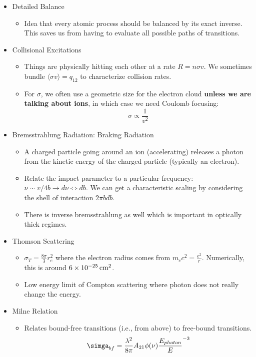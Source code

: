 \documentclass{article}
\newcommand{\unit}[1]{{\,\rm #1}}
\newcommand{\cm}{\unit{cm}}
\begin{document}
\begin{itemize}
    \item Detailed Balance
    \begin{itemize}
        \item Idea that every atomic process should be balanced by its exact inverse. This saves us from having to evaluate all possible paths of transitions.
    \end{itemize}
    
    \item Collisional Excitations
    \begin{itemize}
        \item Things are physically hitting each other at a rate $R = n \sigma v$. We sometimes bundle $\langle \sigma v \rangle = q_{12}$ to characterize collision rates. 
        \item For $\sigma$, we often use a geometric size for the electron cloud \textbf{unless we are talking about ions}, in which case we need Coulomb focusing:
        $$
        \sigma \propto \frac{1}{v^2}
        $$
    \end{itemize}
    
    \item Bremsstrahlung Radiation: Braking Radiation
    \begin{itemize}
        \item A charged particle going around an ion (accelerating) releases a photon from the kinetic energy of the charged particle (typically an electron). 
        \item Relate the impact parameter to a particular frequency: $\nu \sim v/4b \to d\nu \iff db$. We can get a characteristic scaling by considering the shell of interaction $2\pi b db$.
        \item There is inverse bremsstrahlung as well which is important in optically thick regimes. 
    \end{itemize}
    
    \item Thomson Scattering
    \begin{itemize}
        \item $\sigma_T = \frac{8\pi}{3} r_{e}^2$ where the electron radius comes from $m_e c^2 = \frac{e^2}{r}$. Numerically, this is around $6 \times 10^{-25} \cm^2$. 
        \item Low energy limit of Compton scattering where photon does not really change the energy. 
    \end{itemize}
    
    \item Milne Relation
    \begin{itemize}
        \item Relates bound-free transitions (i.e., from above) to free-bound transitions. 
        $$
        \simga_{bf} = \frac{\lambda^2}{8\pi} A_{21} \phi(\nu) \frac{E_{photon}}{E}^{-3}
        $$
        

\end{itemize}
\end{itemize}
\end{document}
